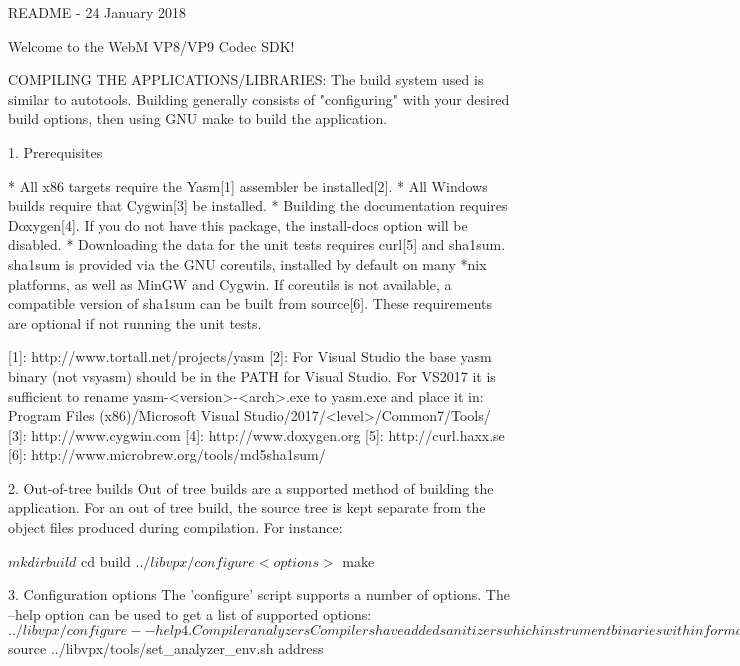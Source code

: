 
\begin{DoxyVerbInclude}
README - 24 January 2018

Welcome to the WebM VP8/VP9 Codec SDK!

COMPILING THE APPLICATIONS/LIBRARIES:
  The build system used is similar to autotools. Building generally consists of
  "configuring" with your desired build options, then using GNU make to build
  the application.

  1. Prerequisites

    * All x86 targets require the Yasm[1] assembler be installed[2].
    * All Windows builds require that Cygwin[3] be installed.
    * Building the documentation requires Doxygen[4]. If you do not
      have this package, the install-docs option will be disabled.
    * Downloading the data for the unit tests requires curl[5] and sha1sum.
      sha1sum is provided via the GNU coreutils, installed by default on
      many *nix platforms, as well as MinGW and Cygwin. If coreutils is not
      available, a compatible version of sha1sum can be built from
      source[6]. These requirements are optional if not running the unit
      tests.

    [1]: http://www.tortall.net/projects/yasm
    [2]: For Visual Studio the base yasm binary (not vsyasm) should be in the
         PATH for Visual Studio. For VS2017 it is sufficient to rename
         yasm-<version>-<arch>.exe to yasm.exe and place it in:
         Program Files (x86)/Microsoft Visual Studio/2017/<level>/Common7/Tools/
    [3]: http://www.cygwin.com
    [4]: http://www.doxygen.org
    [5]: http://curl.haxx.se
    [6]: http://www.microbrew.org/tools/md5sha1sum/

  2. Out-of-tree builds
  Out of tree builds are a supported method of building the application. For
  an out of tree build, the source tree is kept separate from the object
  files produced during compilation. For instance:

    $ mkdir build
    $ cd build
    $ ../libvpx/configure <options>
    $ make

  3. Configuration options
  The 'configure' script supports a number of options. The --help option can be
  used to get a list of supported options:
    $ ../libvpx/configure --help

  4. Compiler analyzers
  Compilers have added sanitizers which instrument binaries with information
  about address calculation, memory usage, threading, undefined behavior, and
  other common errors. To simplify building libvpx with some of these features
  use tools/set_analyzer_env.sh before running configure. It will set the
  compiler and necessary flags for building as well as environment variables
  read by the analyzer when testing the binaries.
    $ source ../libvpx/tools/set_analyzer_env.sh address


\end{DoxyVerbInclude}
